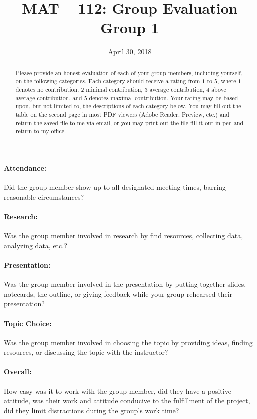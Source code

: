 \documentclass{article}
\title{MAT -- 112: Group Evaluation\\
\large{Group 1}}
\date{April 30, 2018}
\begin{document}
\maketitle

\begin{abstract}
Please provide an honest evaluation of each of your group members, including yourself, on the following categories. Each category should receive a rating from $1$ to $5$, where $1$ denotes no contribution, $2$ minimal contribution, $3$ average contribution, $4$ above average contribution, and $5$ denotes maximal contribution.  Your rating may be based upon, but not limited to, the descriptions of each category below. You may fill out the table on the second page in most PDF viewers (Adobe Reader, Preview, etc.) and return the saved file to me via email, or you may print out the file fill it out in pen and return to my office. 
\end{abstract}

\paragraph*{Attendance:} Did the group member show up to all designated meeting times, barring reasonable circumstances?
\paragraph*{Research:} Was the group member involved in research by find resources, collecting data, analyzing data, etc.?
\paragraph*{Presentation:} Was the group member involved in the presentation by putting together slides, notecards, the outline, or giving feedback while your group rehearsed their presentation?
\paragraph*{Topic Choice:} Was the group member involved in choosing the topic by providing ideas, finding resources, or discussing the topic with the instructor?
\paragraph*{Overall:} How easy was it to work with the group member, did they have a positive attitude, was their work and attitude conducive to the fulfillment of the project, did they limit distractions during the group's work time?
\end{document}
